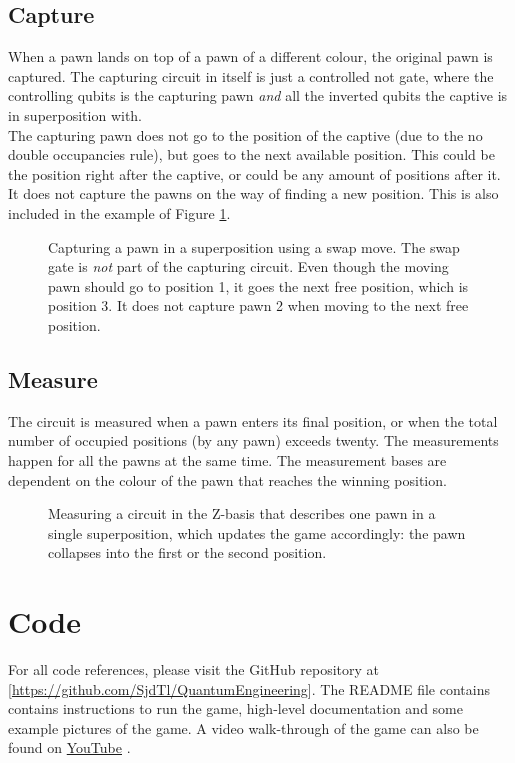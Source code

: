 \documentclass[final,5p,times,twocolumn,authoryear]{elsarticle}
\begin{document}
\subsection{Capture}
When a pawn lands on top of a pawn of a different colour, the original pawn is captured. The capturing circuit in itself is just a controlled not gate, where the controlling qubits is the capturing pawn \textit{and} all the inverted qubits the captive is in superposition with. \\
The capturing pawn does not go to the position of the captive (due to the no double occupancies rule), but goes to the next available position. This could be the position right after the captive, or could be any amount of positions after it. It does not capture the pawns on the way of finding a new position. This is also included in the example of Figure \ref{fig:capture_move}.
\begin{figure}[H]
    \centering
    
    \vspace{-0.9cm}
    \caption{Capturing a pawn in a superposition using a swap move. The swap gate is \textit{not} part of the capturing circuit. Even though the moving pawn should go to position 1, it goes the next free position, which is position 3. It does not capture pawn 2 when moving to the next free position.}
    \label{fig:capture_move}
\end{figure}

\subsection{Measure}
The circuit is measured when a pawn enters its final position, or when the total number of occupied positions (by any pawn) exceeds twenty. The measurements happen for all the pawns at the same time. The measurement bases are dependent on the colour of the pawn that reaches the winning position. 

\begin{figure}[H]
    \centering
    
    \vspace{-0.9cm}
    \caption{Measuring a circuit in the Z-basis that describes one pawn in a single superposition, which updates the game accordingly: the pawn collapses into the first or the second position.}
    \label{fig:measure_move}
\end{figure}


\section{Code}\label{QuantumCode}


For all code references, please visit the GitHub repository at [\url{https://github.com/SjdTl/QuantumEngineering}]. The README file contains contains instructions to run the game, high-level documentation and some example pictures of the game.  A video walk-through of the game can also be found on \href{https://www.youtube.com/watch?v=1wOmJI2PlPA}{\color{red}YouTube} \cite{youtubewalkthrough}.

\printbibliography
\end{document}
